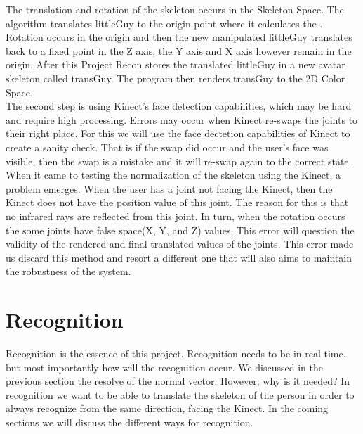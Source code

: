 The translation and rotation of the skeleton occurs in the Skeleton Space. The algorithm translates littleGuy to the origin point where it calculates the \N. Rotation occurs in the origin and then the new manipulated littleGuy translates back to a fixed point in the Z axis, the Y axis and X axis however remain in the origin. After this Project Recon stores the translated littleGuy in a new avatar skeleton called transGuy. The program then renders transGuy to the 2D Color Space. 
\\
The second step is using Kinect's face detection capabilities, which may be 
hard and require high processing. Errors may occur when Kinect re-swaps the joints to their right place. For this we will use the face dectetion capabilities of Kinect to create a sanity check. That is if the swap did occur and the user's face was visible, then the swap is a mistake and it will re-swap again to the correct state.
\\
When it came to testing the normalization of the skeleton using the Kinect, a problem emerges. When the user has a joint not facing the Kinect, then the Kinect does not have the position value of this joint. The reason for this is that no infrared rays are reflected from this joint. In turn, when the rotation occurs the some joints have false space(X, Y, and Z) values. This error will question the validity of the rendered and final translated values of the joints. This error made us discard this method and resort a different one that will also aims to maintain the robustness of the system.
\section{Recognition}
Recognition is the essence of this project. Recognition needs to be in real time, but most importantly how will the recognition occur. We discussed in the previous section the resolve of the normal vector. However, why is it needed? In recognition we want to be able to translate the skeleton of the person in order to always recognize from the same direction, facing the Kinect. In the coming sections we will discuss the different ways for recognition.
